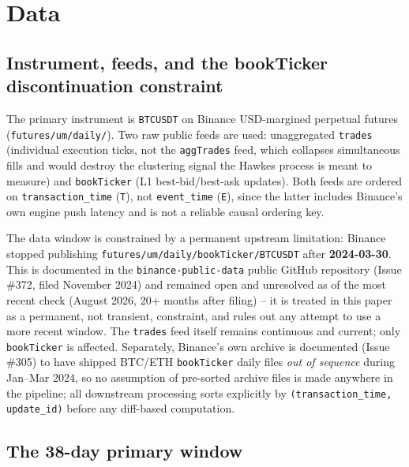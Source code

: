 \section{Data}
\label{sec:data}

\subsection{Instrument, feeds, and the bookTicker discontinuation constraint}
\label{sec:data-feeds}

The primary instrument is \texttt{BTCUSDT} on Binance USD-margined
perpetual futures (\texttt{futures/um/daily/}). Two raw public feeds are
used: unaggregated \texttt{trades} (individual execution ticks, not the
\texttt{aggTrades} feed, which collapses simultaneous fills and would
destroy the clustering signal the Hawkes process is meant to measure) and
\texttt{bookTicker} (L1 best-bid/best-ask updates). Both feeds are ordered
on \texttt{transaction\_time} (\texttt{T}), not \texttt{event\_time}
(\texttt{E}), since the latter includes Binance's own engine push
latency and is not a reliable causal ordering key.

The data window is constrained by a permanent upstream limitation:
Binance stopped publishing \texttt{futures/um/daily/bookTicker/BTCUSDT}
after \textbf{2024-03-30}. This is documented in the
\texttt{binance-public-data} public GitHub repository (Issue \#372, filed
November 2024) and remained open and unresolved as of the most recent
check (August 2026, 20+ months after filing) -- it is treated in this
paper as a permanent, not transient, constraint, and rules out any
attempt to use a more recent window. The \texttt{trades} feed itself
remains continuous and current; only \texttt{bookTicker} is affected.
Separately, Binance's own archive is documented (Issue \#305) to have
shipped BTC/ETH \texttt{bookTicker} daily files \emph{out of sequence}
during Jan--Mar 2024, so no assumption of pre-sorted archive files is
made anywhere in the pipeline; all downstream processing sorts explicitly
by \texttt{(transaction\_time, update\_id)} before any diff-based
computation.

\subsection{The 38-day primary window}
\label{sec:data-window}

